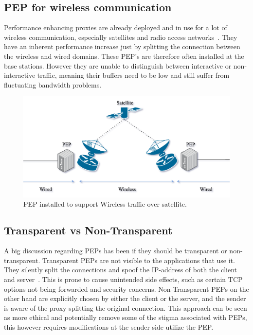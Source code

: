 \documentclass[a4paper,english, 11pt]{report}
\begin{document}
\subsection{PEP for wireless communication}
Performance enhancing proxies are already deployed and in use for a lot of wireless communication, especially satellites and radio access networks~\cite{tcp_mmwave_proxy}. They have an inherent performance increase just by splitting the connection between the wireless and wired domains. These PEP's are therefore often installed at the base stations. However they are unable to distinguish between interactive or non-interactive traffic, meaning their buffers need to be low and still suffer from fluctuating bandwidth problems.

\begin{figure}[h] %
	\centering
	\includegraphics[scale=0.50]{../diagrams/drawio/pep_satellite.png}
  	\caption{PEP installed to support Wireless traffic over satellite.}
  	\label{fig:blockage}
\end{figure}

\subsection{Transparent vs Non-Transparent}
A big discussion regarding PEPs has been if they should be transparent or non-transparent. Transparent PEPs are not visible to the applications that use it. They silently split the connections and spoof the IP-address of both the client and server~\cite{pep_dna}. This is prone to cause unintended side effects, such as certain TCP options not being forwarded and security concerns. Non-Transparent PEPs on the other hand are explicitly chosen by either the client or the server, and the sender is aware of the proxy splitting the original connection. This approach can be seen as more ethical and potentially remove some of the stigma associated with PEPs, this however requires modifications at the sender side utilize the PEP.
\end{document}
